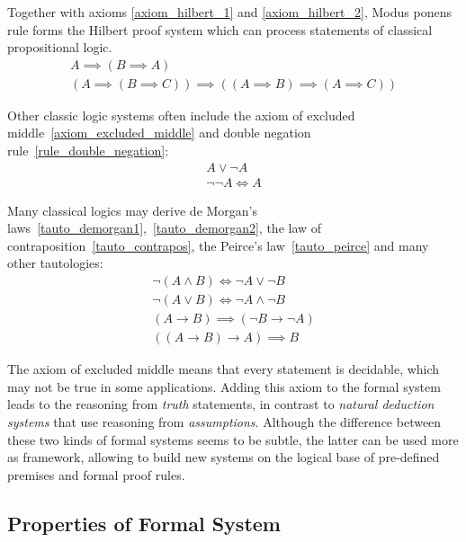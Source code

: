 \documentclass[article]{aaltoseries}
\begin{document}
Together with axioms \eqref{axiom_hilbert_1} and \eqref{axiom_hilbert_2}, Modus ponens rule forms the Hilbert proof system which can process statements of classical propositional logic. %
\begin{gather}
A \implies (B \implies A)
	\label{axiom_hilbert_1}\tag{A1} \\
%
(A \implies (B \implies C)) \implies ((A \implies B) \implies (A \implies C))
	\label{axiom_hilbert_2}\tag{A2}
\end{gather}

Other classic logic systems often include the axiom of excluded middle~\eqref{axiom_excluded_middle} and double negation rule~\eqref{rule_double_negation}:
\begin{gather}
A \lor \neg A
	\label{axiom_excluded_middle}\tag{EM} \\
%
\neg \neg A \Leftrightarrow A
\label{rule_double_negation}\tag{DN}
\end{gather}

Many classical logics may derive de Morgan's laws~\eqref{tauto_demorgan1},~\eqref{tauto_demorgan2}, the law of contraposition~\eqref{tauto_contrapos}, the Peirce's law~\eqref{tauto_peirce} and many other tautologies:
\begin{gather}
\neg (A \land B) \Leftrightarrow \neg A \lor \neg B 
    \label{tauto_demorgan1}\tag{DM1} \\
\neg (A \lor B) \Leftrightarrow \neg A \land \neg B 
    \label{tauto_demorgan2}\tag{DM2} \\
(A \rightarrow B) \implies (\neg B \rightarrow \neg A) 
    \label{tauto_contrapos}\tag{C} \\
((A \rightarrow B) \rightarrow A) \implies B
    \label{tauto_peirce}\tag{P}
\end{gather}

The axiom of excluded middle means that every statement is decidable, which may not be true in some applications. Adding this axiom to the formal system leads to the reasoning from \textit{truth} statements, in contrast to \textit{natural deduction systems} that use reasoning from \textit{assumptions}. Although the difference between these two kinds of formal systems seems to be subtle, the latter can be used more as framework, allowing to build new systems on the logical base of pre-defined premises and formal proof rules. %

\subsection{Properties of Formal System}
\end{document}
